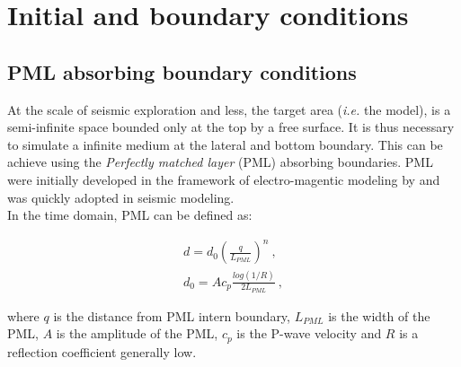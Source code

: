 \documentclass{gnulike}
\begin{document}
\section{Initial and boundary conditions}

\subsection{PML absorbing boundary conditions}

\noindent At the scale of seismic exploration and less, the target area (\textit{i.e.} the model), is a semi-infinite space bounded only at the top by a free surface. It is thus necessary to simulate a infinite medium at the lateral and bottom boundary. This can be achieve using the \textit{Perfectly matched layer} (PML) absorbing boundaries. PML were initially developed in the framework of electro-magentic modeling by \cite{berenger1994perfectly} and was quickly adopted in seismic modeling.\\

\noindent In the time domain, PML can be defined as:

\begin{eqnarray}
\label{eq:pml-equations}
d = d_{0} \left( \frac{q}{L_{PML}} \right) ^{n}\ , \\
d_{0} = Ac_{p} \frac{log(1/R)}{2L_{PML}}\ ,
\end{eqnarray}

\noindent where $q$ is the distance from PML intern boundary, $L_{PML}$ is the width of the PML, $A$ is the amplitude of the PML, $c_{p}$ is the P-wave velocity and $R$ is a reflection coefficient generally low.\\
\end{document}
